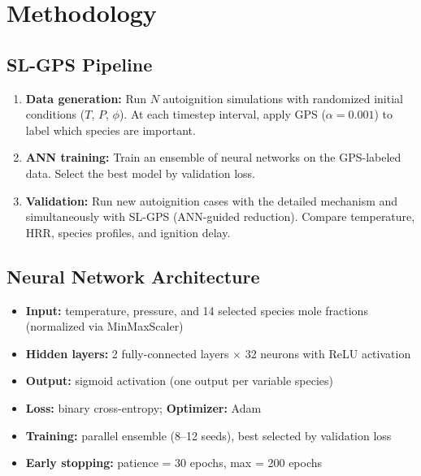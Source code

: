 \documentclass[11pt,a4paper]{article}
\begin{document}
\section{Methodology}
\label{sec:methodology}

\subsection{SL-GPS Pipeline}

\begin{enumerate}
    \item \textbf{Data generation:} Run $N$ autoignition simulations with randomized initial conditions ($T$, $P$, $\phi$). At each timestep interval, apply GPS ($\alpha = 0.001$) to label which species are important.
    \item \textbf{ANN training:} Train an ensemble of neural networks on the GPS-labeled data. Select the best model by validation loss.
    \item \textbf{Validation:} Run new autoignition cases with the detailed mechanism and simultaneously with SL-GPS (ANN-guided reduction). Compare temperature, HRR, species profiles, and ignition delay.
\end{enumerate}

\subsection{Neural Network Architecture}

\begin{itemize}
    \item \textbf{Input:} temperature, pressure, and 14 selected species mole fractions (normalized via MinMaxScaler)
    \item \textbf{Hidden layers:} 2 fully-connected layers $\times$ 32 neurons with ReLU activation
    \item \textbf{Output:} sigmoid activation (one output per variable species)
    \item \textbf{Loss:} binary cross-entropy; \textbf{Optimizer:} Adam
    \item \textbf{Training:} parallel ensemble (8--12 seeds), best selected by validation loss
    \item \textbf{Early stopping:} patience = 30 epochs, max = 200 epochs
\end{itemize}
\end{document}
